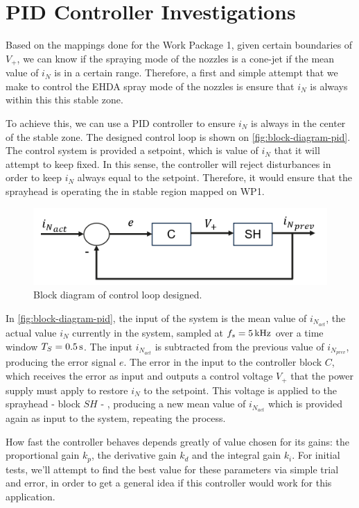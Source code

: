 \documentclass[oneside,12pt]{article}
\begin{document}
\section{PID Controller Investigations}\label{sec:pid}

Based on the mappings done for the Work Package 1, given certain boundaries of $V_+$, we can know if the spraying mode of the nozzles
is a cone-jet if the mean value of $i_N$ is in a certain range. Therefore, a first and simple attempt that we make to control the EHDA
spray mode of the nozzles is ensure that $i_N$ is always within this this stable zone.

To achieve this, we can use a PID controller to ensure $i_N$ is always in the center of the stable zone. The designed control loop 
is shown on \autoref{fig:block-diagram-pid}. The control system is provided a setpoint, which is value of $i_N$ that it will attempt
to keep fixed. In this sense, the controller will reject disturbances in order to keep $i_N$ always equal to the setpoint.
Therefore, it would ensure that the sprayhead is operating the in stable region mapped on WP1. 

\begin{figure}[h!]
    \centering
    \includegraphics[width=.8\textwidth,trim=1 1 1 1,clip]{figures/block-diagram-pid.png}
    \caption{Block diagram of control loop designed.}
    \label{fig:block-diagram-pid}
\end{figure}

In \autoref{fig:block-diagram-pid}, the input of the system is the mean value of $i_{N_{act}}$, the actual value $i_N$ currently
in the system, sampled at $f_s = 5 \,\mathrm{kHz}$ over a time window
$T_S = 0.5 \,\mathrm{s}$. The input $i_{N_{act}}$ is subtracted from the previous value of $i_{N_{prev}}$, producing the error signal $e$. 
The error in the input to the controller block $C$, which receives the error as input and outputs a control voltage $V_+$ that the 
power supply must apply to restore $i_N$ to the setpoint. This voltage is applied to the sprayhead - block $SH$ - , producing a new mean value 
of $i_{N_{act}}$ which is provided again as input to the system, repeating the process.

How fast the controller behaves depends greatly of value chosen for its gains: the proportional gain $k_p$, the derivative gain $k_d$
and the integral gain $k_i$. For initial tests, we'll attempt to find the best value for these parameters via simple trial and error,
in order to get a general idea if this controller would work for this application. 
\end{document}

